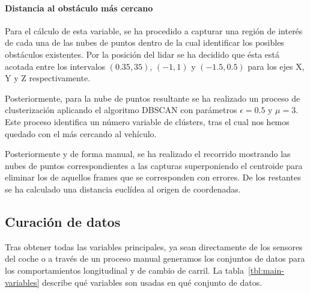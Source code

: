 \paragraph{Distancia al obstáculo más cercano}

Para el cálculo de esta variable, se ha procedido a capturar una región de interés de cada una de las nubes de puntos dentro de la cual identificar los posibles obstáculos existentes. Por la posición del \acrshort{lidar} se ha decidido que ésta está acotada entre los intervalos $(0.35, 35)$, $(-1, 1)$ y $(-1.5, 0.5)$ para los ejes X, Y y Z respectivamente.

Posteriormente, para la nube de puntos resultante se ha realizado un proceso de clusterización aplicando el algoritmo DBSCAN con parámetros $\epsilon = 0.5$ y $\mu = 3$. Este proceso identifica un número variable de clústers, tras el cual nos hemos quedado con el más cercando al vehículo.

Posteriormente y de forma manual, se ha realizado el recorrido mostrando las nubes de puntos correspondientes a las capturas superponiendo el centroide para eliminar los de aquellos frames que se corresponden con errores. De los restantes se ha calculado una distancia euclídea al origen de coordenadas.

\subsection{Curación de datos}

Tras obtener todas las variables principales, ya sean directamente de los sensores del coche o a través de un proceso manual generamos los conjuntos de datos para los comportamientos longitudinal y de cambio de carril. La tabla~\ref{tbl:main-variables} describe qué variables son usadas en qué conjunto de datos.


